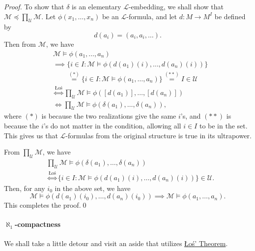 \documentclass[notoc,notitlepage]{tufte-book}
\begin{document}
\begin{proof}
  To show that $\delta$ is an elementary $\mathcal{L}$-embedding, we shall show that $\mathcal{M} \preceq \prod_{\mathcal{U}} \mathcal{M}$. Let $\phi(x_1, \ldots, x_n)$ be an $\mathcal{L}$-formula, and let $d : M \to M^I$ be defined by
  \begin{equation*}
    d(a_i) = (a_i, a_i, \ldots).
  \end{equation*}
  Then from $\mathcal{M}$, we have
  \begin{align*}
    &\mathcal{M} \models \phi(a_1, \ldots, a_n) \\
    &\implies \{ i \in I : \mathcal{M} \models \phi(d(a_1)(i), \ldots, d(a_n)(i)) \} \\
    &\qquad \overset{(*)}{=} \{ i \in I : \mathcal{M} \models \phi(a_1, \ldots, a_n) \} \overset{(**)}{=} I \in \mathcal{U} \\
    &\overset{\hyperref[thm:los]{\text{{\L}o\'{s}}}}{\iff} \prod_{\mathcal{U}} \mathcal{M} \models \phi([d(a_1)], \ldots, [d(a_n)]) \\
    &\iff \prod_{\mathcal{U}} \mathcal{M} \models \phi(\delta(a_1), \ldots, \delta(a_n)),
  \end{align*}
  where $(*)$ is because the two realizations give the same $i$'s, and $(**)$ is because the $i$'s do not matter in the condition, allowing all $i \in I$ to be in the set. This gives us that $\mathcal{L}$-formulas from the original structure is true in its ultrapower.

  From $\prod_{\mathcal{U}} \mathcal{M}$, we have
  \begin{align*}
    &\prod_{\mathcal{U}} \mathcal{M} \models \phi(\delta(a_1), \ldots, \delta(a_n)) \\
    &\overset{\hyperref[thm:los]{\text{{\L}o\'{s}}}}{\iff} \{ i \in I : \mathcal{M} \models \phi(d(a_1)(i), \ldots, d(a_n)(i)) \} \in \mathcal{U}.
  \end{align*}
  Then, for any $i_0$ in the above set, we have
  \begin{equation*}
    \mathcal{M} \models \phi(d(a_1)(i_0), \ldots, d(a_n)(i_0)) \implies \mathcal{M} \models \phi(a_1, \ldots, a_n).
  \end{equation*}
  This completes the proof.\qed\
\end{proof}

\paragraph{$\aleph_1$-compactness} We shall take a little detour and visit an aside that utilizes \hyperref[thm:los]{{\L}o\'{s}' Theorem}.
\end{document}
